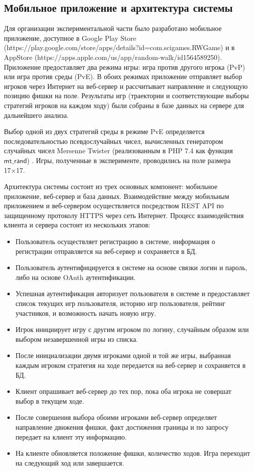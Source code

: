 \subsection{Мобильное приложение и архитектура системы}\label{subsec:ch1/sec3/sub6}

Для организации экспериментальной части было разработано мобильное приложение, 
доступное в Google Play Store (https://play.google.com/store/apps/details?id=com.scigames.RWGame) и 
в AppStore (https://apps.apple.com/us/app/random-walk/id1564589250). Приложение предоставляет два режима игры: 
игра против другого игрока (PvP) или игра против среды (PvE). В обоих режимах приложение отправляет выбор игроков 
через Интернет на веб-сервер и рассчитывает направление и следующую позицию фишки на поле. Результаты игр 
(траектории и соответствующие выборы стратегий игроков на каждом ходу) были собраны в базе данных на сервере для дальнейшего анализа.

Выбор одной из двух стратегий среды в режиме PvE определяется последовательностью псевдослучайных чисел, 
вычисленных генератором случайных чисел Mersenne Twister (реализованным в PHP 7.4 как функция $\mathsf{mt\_rand}$) \cite{}. 
Игры, полученные в эксперименте, проводились на  поле размера 17×17.

Архитектура системы состоит из трех основных компонент: мобильное приложение, веб-сервер и база данных.
Взаимодействие между мобильным приложением и веб-сервером осуществляется посредством REST API по защищенному протоколу HTTPS
через сеть Интернет. Процесс взаимодействия клиента и сервера состоит из нескольких этапов:
\begin{itemize}
\item Пользователь осуществляет регистрацию в системе, информация о регистрации отправляется на веб-сервер и сохраняется в БД.
\item Пользователь аутентифицируется в системе на основе связки логин и пароль, либо на основе OAuth аутентификации.
\item Успешная аутентификация авторизует пользователя в системе и предоставляет список текущих игр пользователя, историю игр пользователя, рейтинг участников, и возможность начать новую игру.
\item Игрок инициирует игру с другим игроком по логину, случайным образом или выбором незавершенной игры из списка.
\item После инициализации двумя игроками одной и той же игры, выбранная каждым игроком стратегия на ходе передается на веб-сервер и сохраняется в БД.
\item Клиент опрашивает веб-сервер до тех пор, пока оба игрока не совершат выбор в текущем ходе.
\item После совершения выбора обоими игроками веб-сервер определяет направление движения фишки, факт достижения границы и по запросу передает на клиент эту информацию.
\item На клиенте обновляется положение фишки, количество ходов. Игра переходит на следующий ход или завершается.
\end{itemize}

